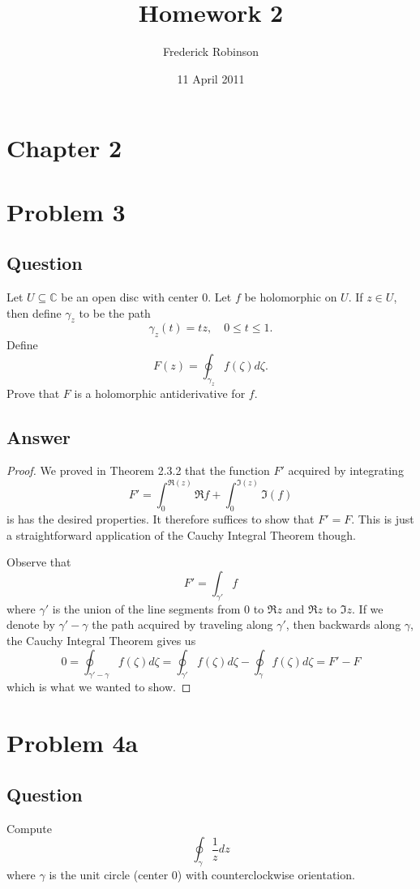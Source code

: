 \documentclass[11pt]{article}
\begin{document}



\title{Homework 2}
\author{Frederick Robinson}
\date{11 April 2011}
\maketitle

\section*{Chapter 2}


\section{Problem  3}
\subsection{Question}
Let $U \subseteq \mathbb{C} $ be an open disc with center 0. Let $f$ be holomorphic on $U$. If $z \in U$, then define $\gamma_z$ to be the path
\[\gamma_z(t) = tz, \quad 0 \leq t \leq 1.\]
Define
\[F(z) = \oint_{\gamma_z} f(\zeta) d\zeta. \]
Prove that $F$ is a holomorphic antiderivative for $f$.
\subsection{Answer}
\begin{proof}
We proved in Theorem 2.3.2 that the function $F'$ acquired by integrating
\[F' = \int_0^{\Re(z)} \Re{f} + \int_0^{\Im(z)}  \Im(f) \]
is has the desired properties. It therefore suffices to show that $F' = F$. This is just a straightforward application of the Cauchy Integral Theorem though. 

Observe that
\[F' = \int_{\gamma'} f\]
where $\gamma'$ is the union of the line segments from 0 to $\Re z$ and $\Re z$ to $\Im z$.  If we denote by $\gamma' - \gamma$ the path acquired by traveling along $\gamma'$, then backwards along $\gamma$, the Cauchy Integral Theorem gives us
\[0 = \oint_{\gamma' - \gamma} f(\zeta) d \zeta = \oint_{\gamma'} f(\zeta) d \zeta - \oint_\gamma f(\zeta) d \zeta  = F' - F\]
which is what we wanted to show.
\end{proof}

\section{Problem  4a}
\subsection{Question}
Compute
\[\oint_\gamma \frac{1}{z} dz\]
where $\gamma$ is the unit circle (center 0) with counterclockwise orientation.
\end{document}
